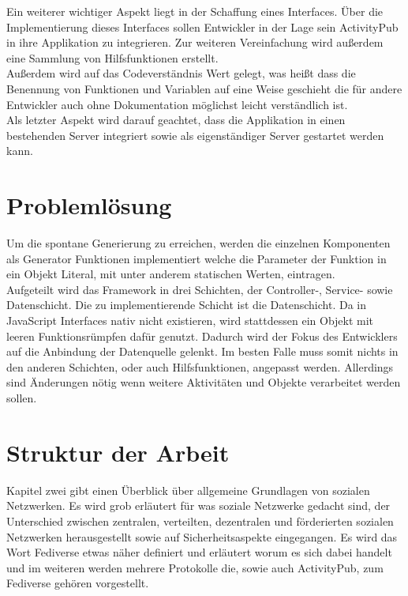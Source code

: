 {	Ein weiterer wichtiger Aspekt liegt in der Schaffung eines Interfaces. Über die Implementierung dieses Interfaces sollen Entwickler in der Lage sein ActivityPub in ihre Applikation zu integrieren. Zur weiteren Vereinfachung wird außerdem eine Sammlung von Hilfsfunktionen erstellt.\\
	
	Außerdem wird auf das Codeverständnis Wert gelegt, was heißt dass die Benennung von Funktionen und Variablen auf eine Weise geschieht die für andere Entwickler auch ohne Dokumentation möglichst leicht verständlich ist.\\
	
	Als letzter Aspekt wird darauf geachtet, dass die Applikation in einen bestehenden Server integriert sowie als eigenständiger Server gestartet werden kann.
	
	\section{Problemlösung}
	Um die spontane Generierung zu erreichen, werden die einzelnen Komponenten als Generator Funktionen implementiert welche die Parameter der Funktion in ein Objekt Literal, mit unter anderem statischen Werten, eintragen.\\
	
	Aufgeteilt wird das Framework in drei Schichten, der Controller-, Service- sowie Datenschicht. Die zu implementierende Schicht ist die Datenschicht. Da in JavaScript Interfaces nativ nicht existieren, wird stattdessen ein Objekt mit leeren Funktionsrümpfen dafür genutzt. Dadurch wird der Fokus des Entwicklers auf die Anbindung der Datenquelle gelenkt. Im besten Falle muss somit nichts in den anderen Schichten, oder auch Hilfsfunktionen, angepasst werden. Allerdings sind Änderungen nötig wenn weitere Aktivitäten und Objekte verarbeitet werden sollen.
}

\section{Struktur der Arbeit}
	Kapitel zwei gibt einen Überblick über allgemeine Grundlagen von sozialen Netzwerken. Es wird grob erläutert für was soziale Netzwerke gedacht sind, der Unterschied zwischen zentralen, verteilten, dezentralen und förderierten sozialen Netzwerken herausgestellt sowie auf Sicherheitsaspekte eingegangen. Es wird das Wort Fediverse etwas näher definiert und erläutert worum es sich dabei handelt und im weiteren werden mehrere Protokolle die, sowie auch ActivityPub, zum Fediverse gehören vorgestellt.\\
	
